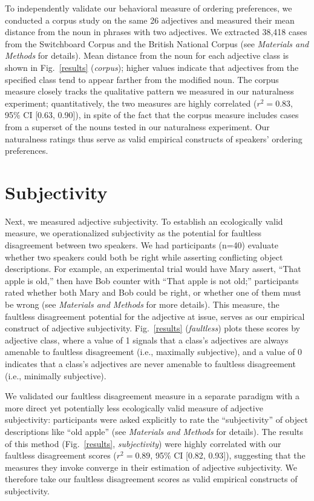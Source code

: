 \documentclass{pnastwo}
\begin{document}
\begin{article}
To independently validate our behavioral measure of ordering preferences, we conducted a corpus study on the same 26 adjectives and measured their mean distance from the noun in phrases with two adjectives. We extracted 38,418 cases from the Switchboard Corpus and the British National Corpus (see \emph{Materials and Methods} for details). Mean distance from the noun for each adjective class is shown in Fig.~\ref{results} (\emph{corpus}); higher values indicate that adjectives from the specified class tend to appear farther from the modified noun. The corpus measure closely tracks the qualitative pattern we measured in our naturalness experiment; quantitatively, the two measures are highly correlated ($r^{2}=0.83$, 95\% CI [0.63, 0.90]), in spite of the fact that the corpus measure includes cases from a superset of the nouns tested in our naturalness experiment. Our naturalness ratings thus serve as valid empirical constructs of speakers' ordering preferences.

\section{Subjectivity}

Next, we measured adjective subjectivity. To establish an ecologically valid measure, we operationalized subjectivity as the potential for faultless disagreement between two speakers. We had participants (n=40) evaluate whether two speakers could both be right while asserting conflicting object descriptions. For example, an experimental trial would have Mary assert, ``That apple is old,'' then have Bob counter with ``That apple is not old;'' 
participants rated whether both Mary and Bob could be right, or whether one of them must be wrong (see \emph{Materials and Methods} for more details). This measure, the faultless disagreement potential for the adjective at issue, serves as our empirical construct of adjective subjectivity. Fig.\ \ref{results} (\emph{faultless}) plots these scores by adjective class, where a value of 1 signals that a class's adjectives are always amenable to faultless disagreement (i.e., maximally subjective), and a value of 0 indicates that a class's adjectives are never amenable to faultless disagreement (i.e., minimally subjective).

We validated our faultless disagreement measure in a separate paradigm with a more direct yet potentially less ecologically valid measure of adjective subjectivity: participants were asked explicitly to rate the ``subjectivity'' of object descriptions like ``old apple'' (see \emph{Materials and Methods} for details). The results of this method (Fig.~\ref{results}, \emph{subjectivity}) were highly correlated with our faultless disagreement scores ($r^{2} = 0.89$, 95\% CI [0.82, 0.93]), suggesting that the measures they invoke converge in their estimation of adjective subjectivity. We therefore take our faultless disagreement scores as valid empirical constructs of subjectivity.


\end{article}
\end{document}
